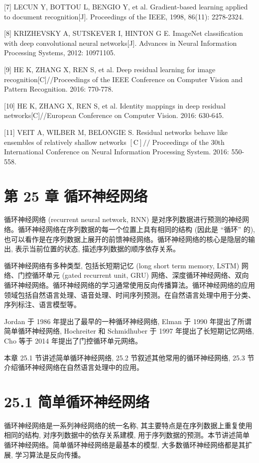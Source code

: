 \documentclass[10pt]{article}
\begin{document}
[7] LECUN Y, BOTTOU L, BENGIO Y, et al. Gradient-based learning applied to document recognition[J]. Proceedings of the IEEE, 1998, 86(11): 2278-2324.

[8] KRIZHEVSKY A, SUTSKEVER I, HINTON G E. ImageNet classification with deep convolutional neural networks[J]. Advances in Neural Information Processing Systems, 2012: 10971105.

[9] HE K, ZHANG X, REN S, et al. Deep residual learning for image recognition[C]//Proceedings of the IEEE Conference on Computer Vision and Pattern Recognition. 2016: 770-778.

[10] HE K, ZHANG X, REN S, et al. Identity mappings in deep residual networks[C]//European Conference on Computer Vision. 2016: 630-645.

[11] VEIT A, WILBER M, BELONGIE S. Residual networks behave like ensembles of relatively shallow networks $[\mathrm{C}] / /$ Proceedings of the 30th International Conference on Neural Information Processing System. 2016: 550-558.

\section*{第 25 章 循环神经网络}
循环神经网络 (recurrent neural network, RNN) 是对序列数据进行预测的神经网络。循环神经网络在序列数据的每一个位置上具有相同的结构 (因此是 “循环” 的), 也可以看作是在序列数据上展开的前馈神经网络。循环神经网络的核心是隐层的输出, 表示当前位置的状态, 描述序列数据的顺序依存关系。

循环神经网络有多种类型, 包括长短期记忆 (long short term memory, LSTM) 网络、门控循环单元 (gated recurrent unit, GRU) 网络、深度循环神经网络、双向循环神经网络。循环神经网络的学习通常使用反向传播算法。循环神经网络的应用领域包括自然语言处理、语音处理、时间序列预测。在自然语言处理中用于分类、序列标注、语言模型等。

Jordan 于 1986 年提出了最早的一种循环神经网络, Elman 于 1990 年提出了所谓简单循环神经网络, Hochreiter 和 Schmidhuber 于 1997 年提出了长短期记忆网络, Cho 等于 2014 年提出了门控循环单元网络。

本章 25.1 节讲述简单循环神经网络, 25.2 节叙述其他常用的循环神经网络, 25.3 节介绍循环神经网络在自然语言处理中的应用。

\section*{25.1 简单循环神经网络}
循环神经网络是一系列神经网络的统一名称, 其主要特点是在序列数据上重复使用相同的结构, 对序列数据中的依存关系建模, 用于序列数据的预测。本节讲述简单循环神经网络。简单循环神经网络是最基本的模型, 大多数循环神经网络都是其扩展, 学习算法是反向传播。
\end{document}

